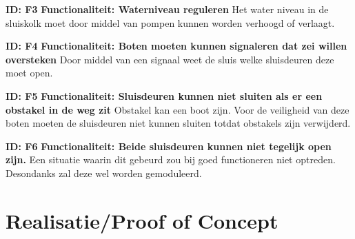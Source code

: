 \documentclass{article}
\begin{document}
\textbf{ID: F3} \newline
\textbf{Functionaliteit: Waterniveau reguleren} \newline
Het water niveau in de sluiskolk moet door middel van pompen kunnen worden verhoogd of verlaagt. \newline

\textbf{ID: F4} \newline
\textbf{Functionaliteit: Boten moeten kunnen signaleren dat zei willen oversteken} \newline
Door middel van een signaal weet de sluis welke sluisdeuren deze moet open. \newline

\textbf{ID: F5} \newline
\textbf{Functionaliteit: Sluisdeuren kunnen niet sluiten als er een obstakel in de weg zit} \newline
Obstakel kan een boot zijn. Voor de veiligheid van deze boten moeten de sluisdeuren niet kunnen sluiten totdat obstakels zijn verwijderd.  \newline

\textbf{ID: F6} \newline
\textbf{Functionaliteit: Beide sluisdeuren kunnen niet tegelijk open zijn.} \newline
Een situatie waarin dit gebeurd zou bij goed functioneren niet optreden. Desondanks zal deze wel worden gemoduleerd. \newline


\section{Realisatie/Proof of Concept}
\end{document}
